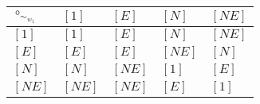 \begin{tabularx}{0.6\textwidth}{l|llll}
$\circ_{\sim_{w_{1}}}$ & $[1]$ & $[E]$ & $[N]$ & $[NE]$ \\
\hline
$[1]$ & $[1]$ & $[E]$ & $[N]$ & $[NE]$ \\
$[E]$ & $[E]$ & $[E]$ & $[NE]$ & $[N]$ \\
$[N]$ & $[N]$ & $[NE]$ & $[1]$ & $[E]$ \\
$[NE]$ & $[NE]$ & $[NE]$ & $[E]$ & $[1]$ \\
\end{tabularx}
